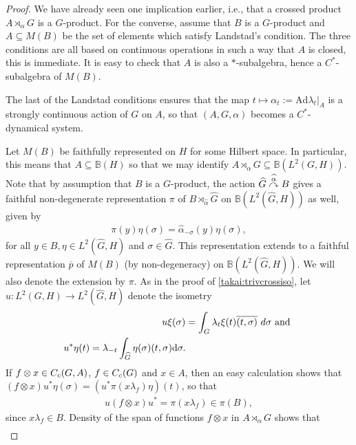 \begin{proof}
	We have already seen one implication earlier, i.e., that a crossed product $A \rtimes_\alpha G$ is a $G$-product. For the converse, assume that $B$ is a $G$-product and $A \subseteq M(B)$ be the set of elements which satisfy Landstad's condition. The three conditions are all based on continuous operations in such a way that $A$ is closed, this is immediate. It is easy to check that $A$ is also a $*$-subalgebra, hence a $C^*$-subalgebra of $M(B)$. 
	
	The last of the Landstad conditions ensures that the map $t \mapsto \alpha_t := \mathrm{Ad} \lambda_t|_A$ is a strongly continuous action of $G$ on $A$, so that $(A, G, \alpha)$ becomes a $C^*$-dynamical system.
	
	Let $M(B)$ be faithfully represented on $H$ for some Hilbert space. In particular, this means that $A \subseteq \mathbb{B}(H)$ so that we may identify $A \rtimes_\alpha G \subseteq \mathbb{B}(L^2(G,H))$. Note that by assumption that $B$ is a $G$-product, the action $\widehat{G} \stackrel{\widehat{\alpha}}{\curvearrowright} B$ gives a faithful non-degenerate representation $\pi$ of $B \rtimes_{\hat \alpha } \hat G$ on $\mathbb{B}(L^2(\hat G, H))$ as well, given by 
	\begin{align*}
		\pi(y) \eta (\sigma) = \hat \alpha_{-\sigma}(y) \eta (\sigma),	
	\end{align*}
	for all $y \in B, \eta \in L^2(\hat G, H)$ and $\sigma \in \hat G$. This representation extends to a faithful representation $\overline p$ of $M(B)$ (by non-degeneracy) on $\mathbb{B}(L^2(\hat G,H))$. We will also denote the extension by $\pi$. As in the proof of \cref{takai:trivcrossiso}, let $u \colon L^2(G,H) \to L^2(\hat G, H)$ denote the isometry
	\begin{align*}
		u \xi(\sigma) &= \int_G \lambda_t \xi(t) \overline{(t,\sigma)} \ d \sigma \text{ and }\\
		u^* \eta(t) = \lambda_{-t} \int_{\widehat{G}} \eta(\sigma) (t, \sigma) \mathrm{d} \sigma.
	\end{align*}
	If $f \otimes x \in C_c(G,A)$, $f \in C_c(G)$ and $x \in A$, then an easy calculation shows that $ (f \otimes x) u^* \eta(\sigma) = (u^* \pi(x \lambda_f) \eta)(t)$, so that
	\begin{align}
		u (f \otimes x) u^* = \pi(x \lambda_f) \in \pi(B),
		\label{eq:lands}
	\end{align}
	since $x \lambda_f \in B$. Density of the span of functions $f \otimes x$ in $A \rtimes_\alpha G$ shows that
	\begin{align*}

\end{align*}
\end{proof}
